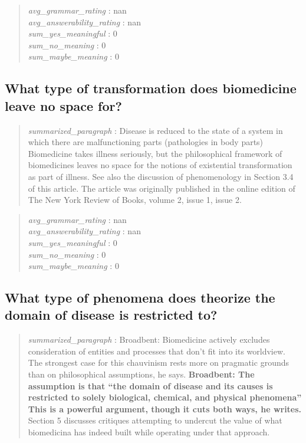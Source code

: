 \begin{quote}
\emph{avg\_grammar\_rating} : nan\\
\emph{avg\_answerability\_rating} : nan\\
\emph{sum\_yes\_meaningful} : 0\\
\emph{sum\_no\_meaning} : 0\\
\emph{sum\_maybe\_meaning} : 0
\end{quote}

\hypertarget{what-type-of-transformation-does-biomedicine-leave-no-space-for}{%
\subsection{What type of transformation does biomedicine leave no space
for?}\label{what-type-of-transformation-does-biomedicine-leave-no-space-for}}

\begin{quote}
\emph{summarized\_paragraph} : Disease is reduced to the state of a
system in which there are malfunctioning parts (pathologies in body
parts) Biomedicine takes illness seriously, but the philosophical
framework of biomedicines leaves no space for the notions of existential
transformation as part of illness. See also the discussion of
phenomenology in Section 3.4 of this article. The article was originally
published in the online edition of The New York Review of Books, volume
2, issue 1, issue 2.
\end{quote}

\begin{quote}
\emph{avg\_grammar\_rating} : nan\\
\emph{avg\_answerability\_rating} : nan\\
\emph{sum\_yes\_meaningful} : 0\\
\emph{sum\_no\_meaning} : 0\\
\emph{sum\_maybe\_meaning} : 0
\end{quote}

\hypertarget{what-type-of-phenomena-does-theorize-the-domain-of-disease-is-restricted-to}{%
\subsection{What type of phenomena does theorize the domain of disease
is restricted
to?}\label{what-type-of-phenomena-does-theorize-the-domain-of-disease-is-restricted-to}}

\begin{quote}
\emph{summarized\_paragraph} : Broadbent: Biomedicine actively excludes
consideration of entities and processes that don't fit into its
worldview. The strongest case for this chauvinism rests more on
pragmatic grounds than on philosophical assumptions, he says.
\textbf{Broadbent: The assumption is that ``the domain of disease and
its causes is restricted to solely biological, chemical, and physical
phenomena'' This is a powerful argument, though it cuts both ways, he
writes.} Section 5 discusses critiques attempting to undercut the value
of what biomedicina has indeed built while operating under that
approach.
\end{quote}


